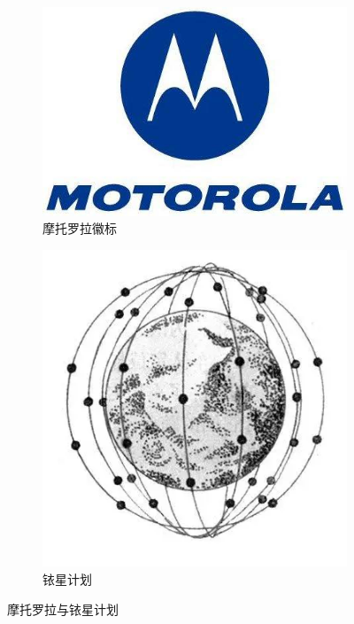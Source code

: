 \documentclass{ctexart}
\begin{document}
\begin{figure}[htpb]
	\centering
	\begin{subfigure}[htpb]{.45\linewidth}
		\centering
		\includegraphics[width=\linewidth]{motorola.jpg}
		\caption{摩托罗拉徽标}
		\label{fig:摩托罗拉徽标}
	\end{subfigure}
	\quad
	\begin{subfigure}[htpb]{.3\linewidth}
		\centering
		\includegraphics[width=\linewidth]{77.png}
		\caption{铱星计划}
		\label{fig:铱星计划}
	\end{subfigure}
	\caption{摩托罗拉与铱星计划}
	\label{fig:摩托罗拉与铱星计划}
\end{figure}
\end{document}

